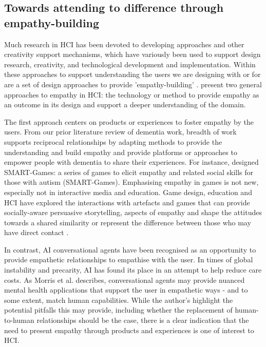 \subsection{Towards attending to difference through empathy-building}
\label{MP:empathyBuilding}
Much research in HCI has been devoted to developing approaches and other creativity support mechanisms, which have variously been used to support design research, creativity, and technological development and implementation. Within these approaches to support understanding the users we are designing with or for are a set of design approaches to provide 'empathy-building' \citep{thieme2014enabling}. \cite{ferri2017rethinking} present two general approaches to empathy in HCI: the technology or method to provide empathy as an outcome in its design and support a deeper understanding of the domain.

The first approach centers on products or experiences to foster empathy by the users. From our prior literature review of dementia work, breadth of work supports reciprocal relationships by adapting methods to provide the understanding and build empathy and provide platforms or approaches to empower people with dementia to share their experiences. For instance, \cite{gotsis2010smart} designed SMART-Games: a series of games to elicit empathy and related social skills for those with autism (SMART-Games). Emphasising empathy in games is not new, especially not in interactive media and education. Game design, education and HCI have explored the interactions with artefacts and games that can provide socially-aware persuasive storytelling, aspects of empathy and shape the attitudes towards a shared similarity or represent the difference between those who may have direct contact \citep{park2018systematic}.

In contrast, AI conversational agents have been recognised as an opportunity to provide empathetic relationships to empathise with the user. In times of global instability and precarity, AI has found its place in an attempt to help reduce care costs. As \cite{morris2018towards} Morris et al. describes, conversational agents may provide nuanced mental health applications that support the user in empathetic ways - and to some extent, match human capabilities. While the author's highlight the potential pitfalls this may provide, including whether the replacement of human-to-human relationships should be the case, there is a clear indication that the need to present empathy through products and experiences is one of interest to HCI.


